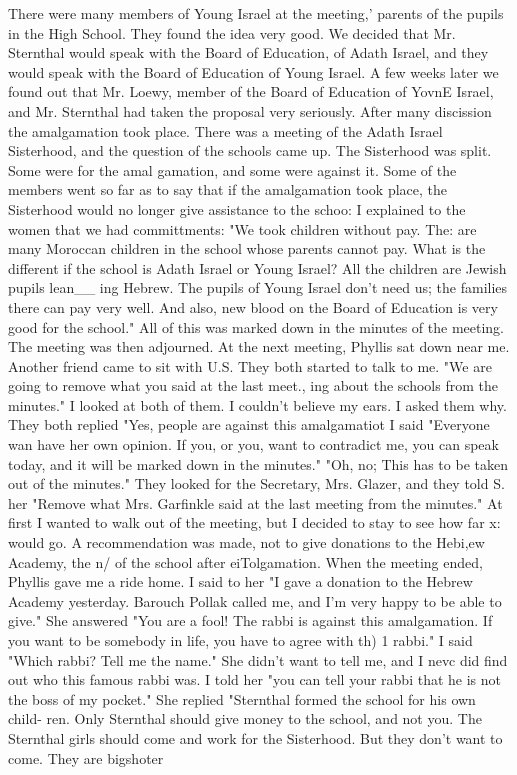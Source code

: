 There were many members of Young Israel at the meeting,' 
parents of the pupils in the High School.
They found the idea very good.
We decided that 
Mr.
Sternthal would speak with the Board of Education, of Adath Israel, and they would 
speak with the Board of Education of Young Israel.
A few weeks later we found out that Mr.
Loewy, member of the Board of Education of YovnE 
Israel, and Mr.
Sternthal had taken the proposal very seriously.
After many discission 
the amalgamation took place.
There was a meeting of the Adath Israel Sisterhood, and 
the question of the schools came up.
The Sisterhood was split.
Some were for the amal 
gamation, and some were against it.
Some of the members went so far as to say that if 
the amalgamation took place, the Sisterhood would no longer give assistance to the schoo: 
I explained to the women that we had committments: "We took children without pay.
The: 
are many Moroccan children in the school whose parents cannot pay.
What is the different 
if the school is Adath Israel or Young Israel?
All the children are Jewish pupils lean__ 
ing Hebrew.
The pupils of Young Israel don't need us; the families there can pay very 
well.
And also, new blood on the Board of Education is very good for the school."
All 
of this was marked down in the minutes of the meeting.
The meeting was then adjourned.
At the next meeting, Phyllis sat down near me.
Another friend came to sit with U.S.
They both started to talk to me.
"We are going to remove what you said at the last meet., 
ing about the schools from the minutes."
I looked at both of them.
I couldn't believe 
my ears.
I asked them why.
They both replied "Yes, people are against this amalgamatiot 
I said "Everyone wan have her own opinion.
If you, or you, want to contradict me, you 
can speak today, and it will be marked down in the minutes."
"Oh, no; This has to be 
taken out of the minutes."
They looked for the Secretary, Mrs.
Glazer, and they told 
S. 
her "Remove what Mrs.
Garfinkle said at the last meeting from the minutes."
At first I wanted to walk out of the meeting, but I decided to stay to see how far x: 
would go.
A recommendation was made, not to give donations to the Hebi,ew Academy, the n/ 
of the school after eiTolgamation.
When the meeting ended, Phyllis gave me a ride home.
I said to her "I gave a donation to the Hebrew Academy yesterday.
Barouch Pollak called 
me, and I'm very happy to be able to give."
She answered "You are a fool!
The rabbi is 
against this amalgamation.
If you want to be somebody in life, you have to agree with th) 
1 
rabbi."
I said "Which rabbi?
Tell me the name."
She didn't want to tell me, and I nevc 
did find out who this famous rabbi was.
I told her "you can tell your rabbi that he is 
not the boss of my pocket."
She replied "Sternthal formed the school for his own child-
ren.
Only Sternthal should give money to the school, and not you.
The Sternthal girls 
should come and work for the Sisterhood.
But they don't want to come.
They are bigshoter